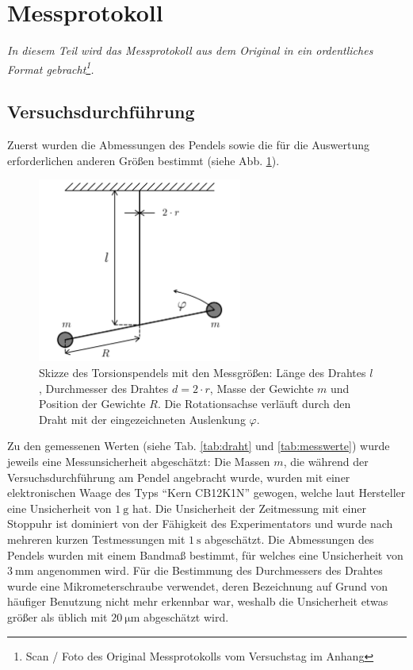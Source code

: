 \section{Messprotokoll}
\textsl{In diesem Teil wird das Messprotokoll aus dem Original in ein ordentliches Format gebracht\footnote{Scan / Foto des Original Messprotokolls vom Versuchstag im Anhang}.}

\subsection{Versuchsdurchführung}
Zuerst wurden die Abmessungen des Pendels sowie die für die Auswertung erforderlichen anderen Größen bestimmt (siehe Abb. \ref{fig:skizze}).
\begin{figure}
    \centering
    \includegraphics[width=0.6\textwidth]{plots/skizze.png}
    \caption{Skizze des Torsionspendels mit den Messgrößen: Länge des Drahtes $l$, Durchmesser des Drahtes $d = 2 \cdot r$, Masse der Gewichte $m$ und Position der Gewichte $R$. Die Rotationsachse verläuft durch den Draht mit der eingezeichneten Auslenkung $\varphi$.}
    \label{fig:skizze}
\end{figure}
Zu den gemessenen Werten (siehe Tab. \ref{tab:draht} und \ref{tab:messwerte}) wurde jeweils eine Messunsicherheit abgeschätzt:
Die Massen $m$, die während der Versuchsdurchführung am Pendel angebracht wurde, wurden mit einer elektronischen Waage des Typs "`Kern CB12K1N"' gewogen, welche laut Hersteller eine Unsicherheit von $\qty{1}{\gram}$ hat.
Die Unsicherheit der Zeitmessung mit einer Stoppuhr ist dominiert von der Fähigkeit des Experimentators und wurde nach mehreren kurzen Testmessungen mit $\qty{1}{\second}$ abgeschätzt.
Die Abmessungen des Pendels wurden mit einem Bandmaß bestimmt, für welches eine Unsicherheit von $\qty{3}{\milli\meter}$ angenommen wird. 
Für die Bestimmung des Durchmessers des Drahtes wurde eine Mikrometerschraube verwendet, deren Bezeichnung auf Grund von häufiger Benutzung nicht mehr erkennbar war, weshalb die Unsicherheit etwas größer als üblich mit $\qty{20}{\micro\meter}$ abgeschätzt wird.

